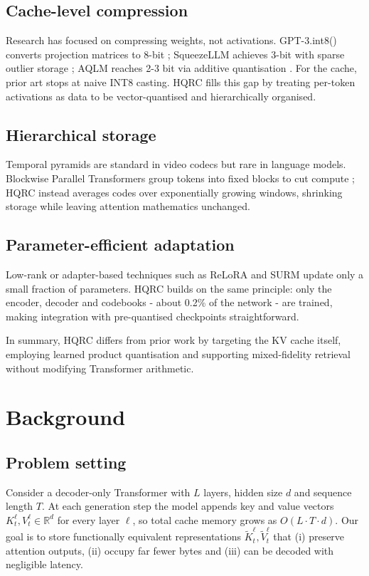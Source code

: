 \documentclass{article}
\begin{document}
\subsection{Cache-level compression}
Research has focused on compressing weights, not activations. GPT-3.int8() converts projection matrices to 8-bit \cite{dettmers-2022-bit}; SqueezeLLM achieves 3-bit with sparse outlier storage \cite{kim-2023-squeezellm}; AQLM reaches 2-3 bit via additive quantisation \cite{egiazarian-2024-extreme}. For the cache, prior art stops at naive INT8 casting. HQRC fills this gap by treating per-token activations as data to be vector-quantised and hierarchically organised.

\subsection{Hierarchical storage}
Temporal pyramids are standard in video codecs but rare in language models. Blockwise Parallel Transformers group tokens into fixed blocks to cut compute \cite{liu-2023-blockwise}; HQRC instead averages codes over exponentially growing windows, shrinking storage while leaving attention mathematics unchanged.

\subsection{Parameter-efficient adaptation}
Low-rank or adapter-based techniques such as ReLoRA \cite{lialin-2023-relora} and SURM \cite{sehanobish-2024-structured} update only a small fraction of parameters. HQRC builds on the same principle: only the encoder, decoder and codebooks - about 0.2\% of the network - are trained, making integration with pre-quantised checkpoints straightforward.

In summary, HQRC differs from prior work by targeting the KV cache itself, employing learned product quantisation and supporting mixed-fidelity retrieval without modifying Transformer arithmetic.

\section{Background}
\subsection{Problem setting}
Consider a decoder-only Transformer with \(L\) layers, hidden size \(d\) and sequence length \(T\). At each generation step the model appends key and value vectors \(K_t^\ell, V_t^\ell \in \mathbb{R}^d\) for every layer \(\ell\), so total cache memory grows as \(O(L\cdot T\cdot d)\). Our goal is to store functionally equivalent representations \(\tilde{K}_t^\ell, \tilde{V}_t^\ell\) that (i) preserve attention outputs, (ii) occupy far fewer bytes and (iii) can be decoded with negligible latency.
\end{document}
